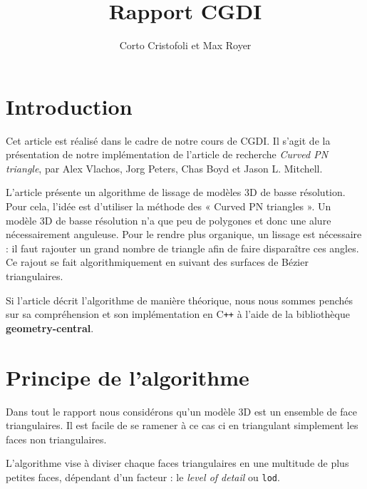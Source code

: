 \documentclass{article}
\title{Rapport CGDI}
\author{Corto Cristofoli et Max Royer}
\def\Cpp{C\texttt{++} }
\begin{document}
\maketitle



\section{Introduction}
Cet article est réalisé dans le cadre de notre cours de CGDI.
Il s'agit de la présentation de notre implémentation de l'article
de recherche \textit{Curved PN triangle}, par Alex Vlachos, Jorg Peters,
Chas Boyd et Jason L. Mitchell.

L'article présente un algorithme de lissage de modèles 3D de basse résolution.
Pour cela, l'idée est d'utiliser la méthode des « Curved PN triangles ». Un
modèle 3D de basse résolution n'a que peu de polygones et donc une alure
nécessairement anguleuse. Pour le rendre plus organique, un lissage est
nécessaire : il faut rajouter un grand nombre de triangle afin de faire
disparaître ces angles. Ce rajout se fait algorithmiquement en suivant des
surfaces de Bézier triangulaires.

Si l'article décrit l'algorithme de manière théorique, nous nous sommes penchés
sur sa compréhension et son implémentation en \Cpp à l'aide de la
bibliothèque \textbf{geometry-central}.


\section{Principe de l'algorithme}

Dans tout le rapport nous considérons qu'un modèle 3D est un ensemble de face
triangulaires. Il est facile de se ramener à ce cas ci en triangulant
simplement les faces non triangulaires.

L'algorithme vise à diviser chaque faces triangulaires en une multitude de plus
petites faces,
dépendant d'un facteur : le \textit{level of detail} ou \texttt{lod}.
\end{document}
